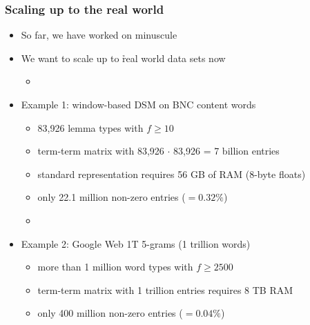 \documentclass[t]{beamer} %
\begin{document}
\begin{frame}
  \frametitle{Scaling up to the real world}

  \begin{itemize}
  \item So far, we have worked on minuscule 
  \item[\hand] We want to scale up to \h{real world} data sets now
    \begin{itemize}
    \item[]
    \end{itemize}
  \item<2-> Example 1: window-based DSM on BNC content words
    \begin{itemize}
    \item 83,926 lemma types with $f\geq 10$
    \item term-term matrix with 83,926 $\cdot$ 83,926 = 7 billion entries
    \item standard representation requires 56 GB of RAM (8-byte floats)%
    \item only 22.1 million non-zero entries ($= 0.32\%$)
    \item[]
    \end{itemize}
  \item<3-> Example 2: Google Web 1T 5-grams (1 trillion words)
    \begin{itemize}
    \item more than 1 million word types with $f\geq 2500$
    \item term-term matrix with 1 trillion entries requires 8 TB RAM
    \item only 400 million non-zero entries ($= 0.04\%$)
    \end{itemize}
  \end{itemize}
\end{frame}
\end{document}
